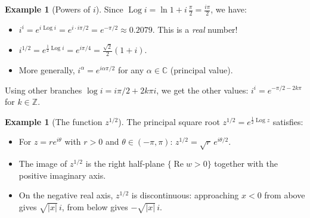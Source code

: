 \documentclass[12pt,a4paper,openany]{book}
\theoremstyle{definition}
\newtheorem{example}[definition]{Example}
\theoremstyle{plain}
\theoremstyle{remark}
\newcommand{\C}{\mathbb{C}}
\newcommand{\Z}{\mathbb{Z}}
\DeclareMathOperator{\re}{Re}
\DeclareMathOperator{\Log}{Log}
\newcommand{\abs}[1]{\left|#1\right|}
\begin{document}
\begin{example}[Powers of $i$]\label{ex:powers-of-i}
Since $\Log i = \ln 1 + i\,\frac{\pi}{2} = \frac{i\pi}{2}$, we have:
\begin{itemize}
  \item $i^i = e^{i\Log i} = e^{i\cdot i\pi/2} = e^{-\pi/2}\approx 0.2079$.
    This is a \emph{real} number!
  \item $i^{1/2} = e^{\frac{1}{2}\Log i} = e^{i\pi/4}
    = \frac{\sqrt{2}}{2}(1+i)$.
  \item More generally, $i^\alpha = e^{i\alpha\pi/2}$ for any $\alpha\in\C$
    (principal value).
\end{itemize}
Using other branches $\log i = i\pi/2 + 2k\pi i$, we get the other values:
$i^i = e^{-\pi/2-2k\pi}$ for $k\in\Z$.
\end{example}

\begin{example}[The function $z^{1/2}$]\label{ex:sqrt-function}
The principal square root $z^{1/2} = e^{\frac{1}{2}\Log z}$ satisfies:
\begin{itemize}
  \item For $z = re^{i\theta}$ with $r>0$ and $\theta\in(-\pi,\pi)$:
    $z^{1/2} = \sqrt{r}\,e^{i\theta/2}$.
  \item The image of $z^{1/2}$ is the right half-plane $\{\re w > 0\}$
    together with the positive imaginary axis.
  \item On the negative real axis, $z^{1/2}$ is discontinuous: approaching
    $x<0$ from above gives $\sqrt{\abs{x}}\,i$, from below gives
    $-\sqrt{\abs{x}}\,i$.
\end{itemize}
\end{example}
\end{document}
